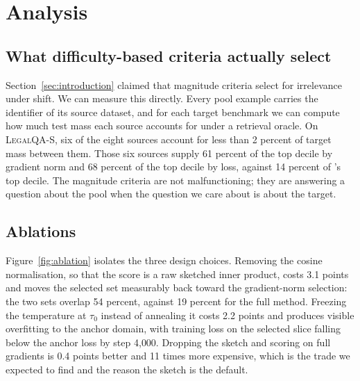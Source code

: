 \section{Analysis}
\label{sec:analysis}

\subsection{What difficulty-based criteria actually select}

Section~\ref{sec:introduction} claimed that magnitude criteria select for
irrelevance under shift. We can measure this directly. Every pool example
carries the identifier of its source dataset, and for each target benchmark we
can compute how much test mass each source accounts for under a retrieval
oracle. On \textsc{LegalQA-S}, six of the eight sources account for less than 2
percent of target mass between them. Those six sources supply 61 percent of the
top decile by gradient norm and 68 percent of the top decile by loss, against
14 percent of \method{}'s top decile. The magnitude criteria are not
malfunctioning; they are answering a question about the pool when the question
we care about is about the target.

\subsection{Ablations}

Figure~\ref{fig:ablation} isolates the three design choices. Removing the
cosine normalisation, so that the score is a raw sketched inner product, costs
3.1 points and moves the selected set measurably back toward the gradient-norm
selection: the two sets overlap 54 percent, against 19 percent for the full
method. Freezing the temperature at $\tau_0$ instead of annealing it costs 2.2
points and produces visible overfitting to the anchor domain, with training
loss on the selected slice falling below the anchor loss by step 4{,}000.
Dropping the sketch and scoring on full gradients is 0.4 points better and 11
times more expensive, which is the trade we expected to find and the reason the
sketch is the default.

